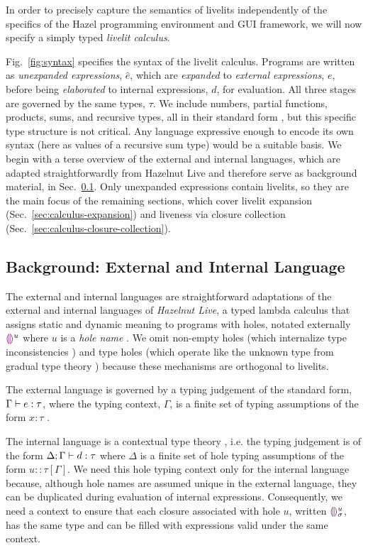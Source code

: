In order to precisely capture the semantics of livelits
independently
of the specifics of the Hazel programming environment and GUI
framework, we will now specify a simply typed \emph{livelit calculus}.

Fig.~\ref{fig:syntax} specifies the syntax of the livelit calculus.
Programs are written as \emph{unexpanded expressions}, $\hat e$, which are \emph{expanded} to
\emph{external expressions}, $e$, before being \emph{elaborated}
to internal expressions, $d$, for evaluation. All three stages are governed
by the same types, $\tau$. We include numbers, partial functions, products, sums, and recursive
types, all in their standard form \cite{pfpl}, but this specific type structure is not critical.
Any language expressive
enough to encode its own syntax (here as values of a recursive sum type)
would be a suitable basis. We begin with a terse
overview of the external and internal languages,
which are adapted straightforwardly from Hazelnut Live \cite{HazelnutLive} and therefore
serve as background material, in Sec.~\ref{sec:external-and-internal-lang}.
Only unexpanded expressions contain
livelits, so they are the main focus of the remaining sections,
which cover livelit expansion (Sec.~\ref{sec:calculus-expansion}) and 
liveness via closure collection (Sec.~\ref{sec:calculus-closure-collection}). 


\subsection{Background: External and Internal Language}\label{sec:external-and-internal-lang}
The external and internal languages are straightforward adaptations of the
external and internal languages of \emph{Hazelnut Live},
a typed lambda calculus that assigns static and dynamic meaning to programs with holes,
notated externally $\textcolor{violet}{\llparenthesis}\textcolor{violet}{\rrparenthesis}^{u}$ where $u$ is a \emph{hole name} \cite{HazelnutLive}.
We omit non-empty holes (which internalize type inconsistencies \cite{Hazelnut}) and type holes
(which operate like the unknown type from gradual type theory \cite{Siek06a,Hazelnut})
because these mechanisms are orthogonal to livelits.

The external language is governed by a typing judgement of the standard form, $\Gamma \vdash e : \tau$,
where the typing context, $\Gamma$,
is a finite set of typing assumptions of the form $x : \tau$ \cite{pfpl}.

The internal language is a contextual type theory \cite{Nanevski2008}, i.e. the typing judgement is
of the form $\Delta; \Gamma \vdash d : \tau$ where $\Delta$ is a finite set of hole typing
assumptions of the form $u :: \tau[\Gamma]$.
We need this hole typing context only for the internal language because, although hole names are assumed
unique in the external language, they can be duplicated during evaluation of internal expressions.
Consequently, we need a context to ensure that each closure associated with hole $u$, written ${\textcolor{violet}{\llparenthesis}\textcolor{violet}{\rrparenthesis}}{^{u}_{\sigma}}$,
has the same type and can be filled
with expressions valid under the same context.

